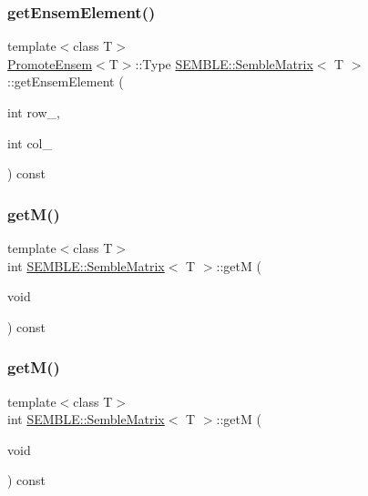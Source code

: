 \subsubsection{\texorpdfstring{getEnsemElement()}{getEnsemElement()}\hspace{0.1cm}{\footnotesize\ttfamily [2/2]}}
{\footnotesize\ttfamily template$<$class T$>$ \\
\mbox{\hyperlink{structSEMBLE_1_1PromoteEnsem}{Promote\+Ensem}}$<$T$>$\+::Type \mbox{\hyperlink{structSEMBLE_1_1SembleMatrix}{S\+E\+M\+B\+L\+E\+::\+Semble\+Matrix}}$<$ T $>$\+::get\+Ensem\+Element (\begin{DoxyParamCaption}\item[{int}]{row\+\_\+,  }\item[{int}]{col\+\_\+ }\end{DoxyParamCaption}) const}

\mbox{\label{structSEMBLE_1_1SembleMatrix_a26d2ee5bf9ad9cb0fdd30bce5abadf92}} 
\subsubsection{\texorpdfstring{getM()}{getM()}\hspace{0.1cm}{\footnotesize\ttfamily [1/2]}}
{\footnotesize\ttfamily template$<$class T$>$ \\
int \mbox{\hyperlink{structSEMBLE_1_1SembleMatrix}{S\+E\+M\+B\+L\+E\+::\+Semble\+Matrix}}$<$ T $>$\+::getM (\begin{DoxyParamCaption}\item[{void}]{ }\end{DoxyParamCaption}) const\hspace{0.3cm}{\ttfamily [inline]}}

\mbox{\label{structSEMBLE_1_1SembleMatrix_a26d2ee5bf9ad9cb0fdd30bce5abadf92}} 
\subsubsection{\texorpdfstring{getM()}{getM()}\hspace{0.1cm}{\footnotesize\ttfamily [2/2]}}
{\footnotesize\ttfamily template$<$class T$>$ \\
int \mbox{\hyperlink{structSEMBLE_1_1SembleMatrix}{S\+E\+M\+B\+L\+E\+::\+Semble\+Matrix}}$<$ T $>$\+::getM (\begin{DoxyParamCaption}\item[{void}]{ }\end{DoxyParamCaption}) const\hspace{0.3cm}{\ttfamily [inline]}}

